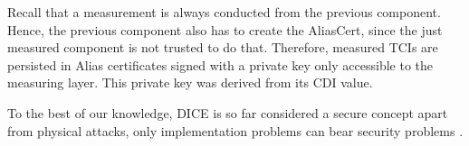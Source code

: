 


Recall that a measurement is always conducted from the previous component. Hence, the previous component also has to create the AliasCert, since the just measured component is not trusted to do that.
Therefore, measured TCIs are persisted in Alias certificates signed with a private key only accessible to the measuring layer. This private key was derived from its CDI value.



To the best of our knowledge, \ac{DICE} is so far considered a secure concept apart from physical attacks, only implementation problems can bear security problems \cite{Jaeger2020, Hristozov2022}.
